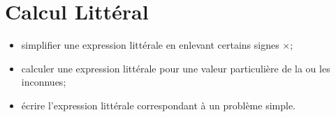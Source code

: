 \chapter{Calcul Littéral}\label{ChCalculLitteral}

\vspace{5cm}
\begin{acquis}
\begin{itemize}
\item simplifier une expression littérale en enlevant certains signes $\times$;
\item calculer une expression littérale pour une valeur particulière de la ou les inconnues;
\item écrire l'expression littérale correspondant à un problème simple.
\end{itemize}
\end{acquis}

\activites



\cours


\exercicesbase
\begin{colonne*exercice}

\end{colonne*exercice}


\exercicesappr
\begin{colonne*exercice}

\end{colonne*exercice}

\connaissances


\TravauxPratiques %


\pagebreak

\recreation



